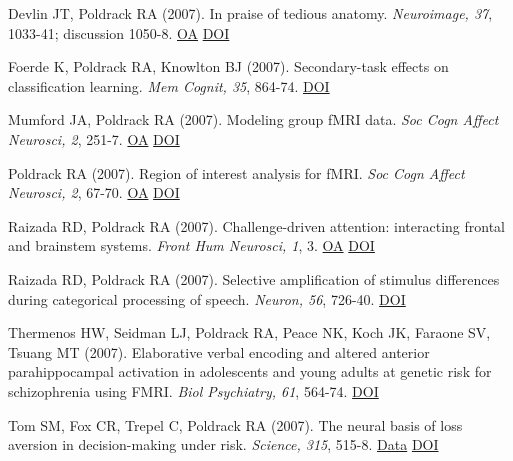 \documentclass[10pt, letterpaper]{article}
\begin{document}
Devlin JT, Poldrack RA (2007). In praise of tedious anatomy. \textit{Neuroimage, 37}, 1033-41; discussion 1050-8. \href{https://www.ncbi.nlm.nih.gov/pmc/articles/PMC1986635}{OA} \href{http://dx.doi.org/10.1016/j.neuroimage.2006.09.055}{DOI} \vspace{2mm}

Foerde K, Poldrack RA, Knowlton BJ (2007). Secondary-task effects on classification learning. \textit{Mem Cognit, 35}, 864-74. \href{http://dx.doi.org/10.3758/bf03193461}{DOI} \vspace{2mm}

Mumford JA, Poldrack RA (2007). Modeling group fMRI data. \textit{Soc Cogn Affect Neurosci, 2}, 251-7. \href{https://www.ncbi.nlm.nih.gov/pmc/articles/PMC2569805}{OA} \href{http://dx.doi.org/10.1093/scan/nsm019}{DOI} \vspace{2mm}

Poldrack RA (2007). Region of interest analysis for fMRI. \textit{Soc Cogn Affect Neurosci, 2}, 67-70. \href{https://www.ncbi.nlm.nih.gov/pmc/articles/PMC2555436}{OA} \href{http://dx.doi.org/10.1093/scan/nsm006}{DOI} \vspace{2mm}

Raizada RD, Poldrack RA (2007). Challenge-driven attention: interacting frontal and brainstem systems. \textit{Front Hum Neurosci, 1}, 3. \href{https://www.ncbi.nlm.nih.gov/pmc/articles/PMC2525983}{OA} \href{http://dx.doi.org/10.3389/neuro.09.003.2007}{DOI} \vspace{2mm}

Raizada RD, Poldrack RA (2007). Selective amplification of stimulus differences during categorical processing of speech. \textit{Neuron, 56}, 726-40. \href{http://dx.doi.org/10.1016/j.neuron.2007.11.001}{DOI} \vspace{2mm}

Thermenos HW, Seidman LJ, Poldrack RA, Peace NK, Koch JK, Faraone SV, Tsuang MT (2007). Elaborative verbal encoding and altered anterior parahippocampal activation in adolescents and young adults at genetic risk for schizophrenia using FMRI. \textit{Biol Psychiatry, 61}, 564-74. \href{http://dx.doi.org/10.1016/j.biopsych.2006.04.044}{DOI} \vspace{2mm}

Tom SM, Fox CR, Trepel C, Poldrack RA (2007). The neural basis of loss aversion in decision-making under risk. \textit{Science, 315}, 515-8. \href{https://openneuro.org/datasets/ds000008/versions/00001}{Data} \href{http://dx.doi.org/10.1126/science.1134239}{DOI} \vspace{2mm}
\end{document}
